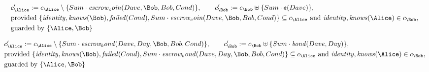 \begin{align*}
&
c'_
{
\Alice
}
 := 
c_
{
\Alice
}
 \setminus 
\{
Sum
\cdot
\mathit{
escrow_coin
}
(
Dave
,
\Bob
,
Bob
,
Cond
)
\}
, \qquad 
c'_
{
\Bob
}
 := 
c_
{
\Bob
}
 \uplus 
\{
Sum
\cdot
\text{\textcent}
(
Dave
)
\}
,\\
&
\text{provided } 
\{
\mathit{
identity
}
,
\mathit{
knows
}
(
\Bob
)
,
\mathit{
failed
}
(
Cond
)
,
Sum
\cdot
\mathit{
escrow_coin
}
(
Dave
,
\Bob
,
Bob
,
Cond
)
\}
 \subseteq c_
{
\Alice
}
 \text{ and } 
\mathit{
identity
}
,
\mathit{
knows
}
(
\Alice
)
 \in c_
{
\Bob
}
,\\
&
\text{guarded by } \{
\Alice
,
\Bob
\}
\end{align*}

\begin{align*}
&
c'_
{
\Alice
}
 := 
c_
{
\Alice
}
 \setminus 
\{
Sum
\cdot
\mathit{
escrow_bond
}
(
Dave
,
Day
,
\Bob
,
Bob
,
Cond
)
\}
, \qquad 
c'_
{
\Bob
}
 := 
c_
{
\Bob
}
 \uplus 
\{
Sum
\cdot
\mathit{
bond
}
(
Dave
,
Day
)
\}
,\\
&
\text{provided } 
\{
\mathit{
identity
}
,
\mathit{
knows
}
(
\Bob
)
,
\mathit{
failed
}
(
Cond
)
,
Sum
\cdot
\mathit{
escrow_bond
}
(
Dave
,
Day
,
\Bob
,
Bob
,
Cond
)
\}
 \subseteq c_
{
\Alice
}
 \text{ and } 
\mathit{
identity
}
,
\mathit{
knows
}
(
\Alice
)
 \in c_
{
\Bob
}
,\\
&
\text{guarded by } \{
\Alice
,
\Bob
\}
\end{align*}
